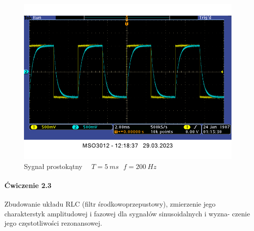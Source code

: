 \documentclass[14pt, table]{extarticle}
\begin{document}
\begin{figure}[H]
\includegraphics[scale=0.65]{RC-square-5ms}
\centering
\captionsetup{labelformat=empty}
\caption{Sygnał prostokątny \ \ $T = 5 \ ms \ \ \ f = 200 \ Hz$}
\end{figure}

\newpage
\paragraph{Ćwiczenie 2.3 \\}
Zbudowanie układu RLC (filtr środkowoprzepustowy), zmierzenie jego charakterstyk amplitudowej i fazowej dla sygnałów sinusoidalnych i wyzna- czenie jego częstotliwości rezonansowej.

\begin{figure}[H]
    \centering
    \qquad
\end{figure}
\end{document}
